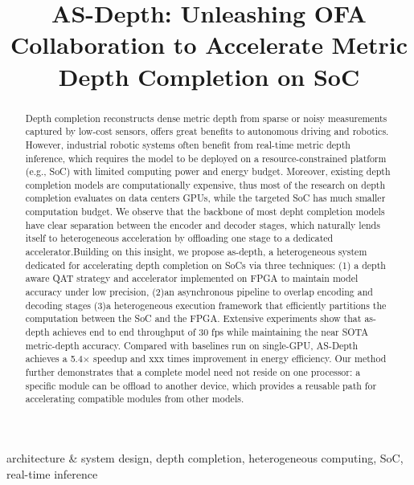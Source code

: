 \documentclass[conference]{support/IEEEtran}
\begin{document}
\title{AS-Depth: Unleashing OFA Collaboration to Accelerate Metric Depth Completion on SoC}

\author{
}

\maketitle

\begin{abstract}
Depth completion reconstructs dense metric depth from sparse or noisy measurements captured by low-cost sensors,
offers great benefits to autonomous driving and robotics.
However, industrial robotic systems often benefit from real-time metric depth inference,
which requires the model to be deployed on a resource-constrained platform (e.g., SoC) with limited computing power and energy budget.
Moreover, existing depth completion models are computationally expensive,
thus most of the research on depth completion evaluates on data centers GPUs, while the targeted SoC has much smaller computation budget.
We observe that the backbone of most depht completion models have clear separation between the encoder and decoder stages, which naturally lends itself to heterogeneous acceleration by offloading one stage to a dedicated accelerator.Building on this insight, we propose as-depth, a heterogeneous system dedicated for accelerating depth completion on SoCs via three techniques: (1) a depth aware QAT strategy and accelerator implemented on FPGA to maintain model accuracy under low precision, (2)an asynchronous pipeline to overlap encoding and decoding stages (3)a heterogeneous execution framework that efficiently partitions the computation between the SoC and the FPGA.
Extensive experiments show that as-depth achieves end to end throughput of 30 fps while maintaining the near SOTA metric-depth accuracy.
Compared with baselines run on single-GPU, AS-Depth achieves a 5.4$\times$ speedup and xxx times improvement in energy efficiency.
Our method further demonstrates that a complete model need not reside on one processor:
a specific module can be offload to another device,
which provides a reusable path for accelerating compatible modules from other models.
\end{abstract}

\begin{IEEEkeywords}
architecture \& system design, depth completion, heterogeneous computing, SoC, real-time inference
\end{IEEEkeywords}
\end{document}
